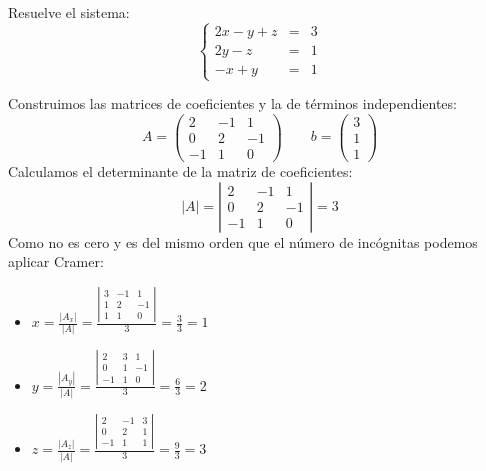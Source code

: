 \documentclass[a4paper,11pt,answers]{exam}
\begin{document}
\begin{questions}
\question Resuelve el sistema:
\[\left\lbrace\begin{array}{lll}
	2x - y + z &=&3\\
	2y - z &=& 1\\
	-x + y &=& 1
\end{array}\right.\]
\begin{solution}
	Construimos las matrices de coeficientes y la de términos independientes:
	\[A=\left(\begin{array}{rrr}
		2&-1&1\\
		0&2&-1\\
		-1&1&0
	\end{array}\right)\quad\quad b= \left(\begin{array}{r}
	3\\1\\1
\end{array}\right)\]
Calculamos el determinante de la matriz de coeficientes:
\[|A| = \left|\begin{array}{rrr}
	2&-1&1\\
	0&2&-1\\
	-1&1&0
\end{array}\right| = 3\]
Como no es cero y es del mismo orden que el número de incógnitas podemos aplicar Cramer:
\begin{itemize}
	\item $x = \frac{|A_x|}{|A|} = \frac{\left|\begin{array}{rrr}
		3&-1&1\\
		1&2&-1\\
		1&1&0
	\end{array}\right|}{3} = \frac{3}{3} = 1$

	\item $y = \frac{|A_y|}{|A|} = \frac{\left|\begin{array}{rrr}
			2&3&1\\
			0&1&-1\\
			-1&1&0
		\end{array}\right|}{3} = \frac{6}{3} = 2$
	\item $z = \frac{|A_z|}{|A|} = \frac{\left|\begin{array}{rrr}
			2&-1&3\\
			0&2&1\\
			-1&1&1
		\end{array}\right|}{3} = \frac{9}{3} = 3$
\end{itemize}
\end{solution}
\end{questions}
\end{document}
